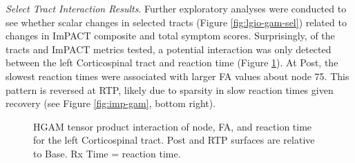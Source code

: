 \documentclass[12pt]{article}
\begin{document}

\textit{Select Tract Interaction Results}. Further exploratory analyses were conducted to see whether scalar changes in selected tracts (Figure \ref{fig:lgio-gam-sel}) related to changes in ImPACT composite and total symptom scores. Surprisingly, of the tracts and ImPACT metrics tested, a potential interaction was only detected between the left Corticospinal tract and reaction time (Figure \ref{fig:lgio-intx-lcs}). At Post, the slowest reaction times were associated with larger FA values about node 75. This pattern is reversed at RTP, likely due to sparsity in slow reaction times given recovery (see Figure \ref{fig:imp-gam}, bottom right).

\begin{figure}[H]
	\centering
	\caption{HGAM tensor product interaction of node, FA, and reaction time for the left Corticospinal tract. Post and RTP surfaces are relative to Base. Rx Time = reaction time.}
	\label{fig:lgio-intx-lcs}
\end{figure}
\end{document}
